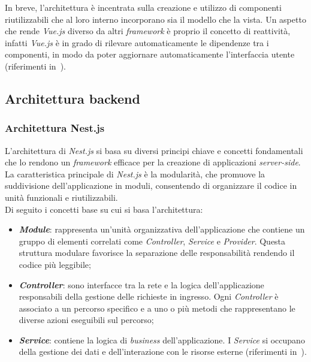 In breve, l'architettura è incentrata sulla creazione e utilizzo di componenti riutilizzabili che al loro interno incorporano sia il modello che la vista. Un aspetto che rende \textit{Vue.js}
diverso da altri \textit{framework} è proprio il concetto di reattività, infatti \textit{Vue.js} è in grado di rilevare automaticamente le dipendenze tra i componenti, in modo da poter aggiornare automaticamente l'interfaccia utente (riferimenti in~\cite{site:vue-architettura}).

\subsection{Architettura backend}\label{subsec:architettura-backend}
\subsubsection{Architettura Nest.js}\label{subsubsec:architettura-nest-js}
L'architettura di \textit{Nest.js} si basa su diversi principi chiave e concetti fondamentali che lo rendono un \textit{framework} efficace per la creazione di applicazioni \textit{server-side}.
La caratteristica principale di \textit{Nest.js} è la modularità, che promuove la suddivisione dell'applicazione in moduli, consentendo di organizzare il codice in unità funzionali e riutilizzabili.\\
Di seguito i concetti base su cui si basa l'architettura:
\begin{itemize}
  \item \textbf{\textit{Module}}: rappresenta un'unità organizzativa dell'applicazione che contiene un gruppo di elementi correlati come \textit{Controller}, \textit{Service} e \textit{Provider}. Questa struttura modulare 
  favorisce la separazione delle responsabilità rendendo il codice più leggibile;
  \item \textbf{\textit{Controller}}: sono interfacce tra la rete e la logica dell'applicazione responsabili della gestione delle richieste  in ingresso. Ogni \textit{Controller} è associato a un percorso specifico e a uno o più metodi che rappresentano le diverse azioni eseguibili sul percorso;
  \item \textbf{\textit{Service}}: contiene la logica di \textit{business} dell'applicazione. I \textit{Service} si occupano della gestione dei dati e dell'interazione con le risorse esterne (riferimenti in~\cite{site:nest-architettura}).
\end{itemize}
